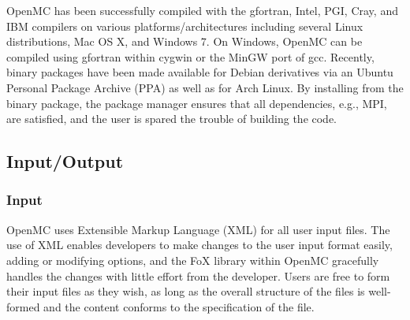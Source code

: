 \documentclass[5p,authoryear]{elsarticle}
\begin{document}
OpenMC has been successfully compiled with the gfortran, Intel, PGI, Cray, and
IBM compilers on various platforms/architectures including several Linux
distributions, Mac OS X, and Windows 7. On Windows, OpenMC can be compiled using
gfortran within cygwin or the MinGW port of gcc. Recently, binary packages have
been made available for Debian derivatives via an Ubuntu Personal Package
Archive (PPA) as well as for Arch Linux. By installing from the binary package,
the package manager ensures that all dependencies, e.g., MPI, are satisfied, and
the user is spared the trouble of building the code.

\subsection{Input/Output}

\subsubsection{Input}

OpenMC uses Extensible Markup Language (XML) for all user input files. The use
of XML enables developers to make changes to the user input format easily,
adding or modifying options, and the FoX library within OpenMC gracefully
handles the changes with little effort from the developer. Users are free to
form their input files as they wish, as long as the overall structure of the
files is well-formed and the content conforms to the specification of the file.
\end{document}
